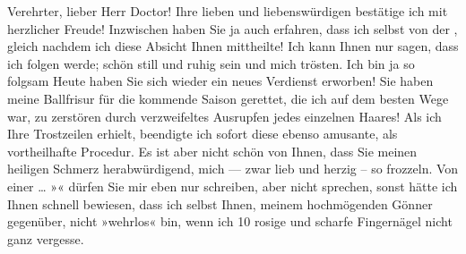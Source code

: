 \pstart{}Verehrter, lieber Herr Doctor!\pend\vspace{0.5em}
\pstart
           Ihre lieben und liebenswürdigen \label{K_L03715-1v}\label{K_L03715-1}
               bestätige ich \introOben{}mit\introOben{}
               herzlicher Freude! Inzwischen haben Sie ja auch erfahren, dass ich selbst von der
                  \label{K_L03715-2v}\label{K_L03715-2}{ }\label{K_L03715-3v}\label{K_L03715-3}, gleich
               nachdem ich diese Absicht Ihnen mittheilte! Ich kann Ihnen nur sagen, dass ich folgen
               werde; schön still und ruhig sein und mich trösten. Ich bin ja so folg{\pb}sam{\dotstwo}{ }Heute haben Sie sich wieder ein neues Verdienst erworben! Sie haben
               meine Ballfrisur für die kommende Saison gerettet, die ich auf dem besten Wege war,
               zu zerstören durch verzweifeltes Ausrupfen jedes einzelnen Haares! Als ich Ihre
               Trostzeilen erhielt, beendigte ich sofort diese ebenso amusante, als vortheilhafte
               Procedur. Es ist aber nicht schön von Ihnen, dass Sie meinen heiligen Schmerz
               herabwürdigend, mich — zwar lieb und herzig – so frozzeln. Von einer … »\label{K_L03715-4v}\label{K_L03715-4}{\dotstwo}« dürfen Sie mir eben nur schreiben, aber nicht spre{\pb}chen, sonst hätte ich Ihnen schnell bewiesen, dass ich
               selbst Ihnen, meinem hochmögenden Gönner gegenüber, nicht »wehrlos« bin, wenn ich 10
               rosige und scharfe Fingernägel nicht ganz vergesse.\pend
           
